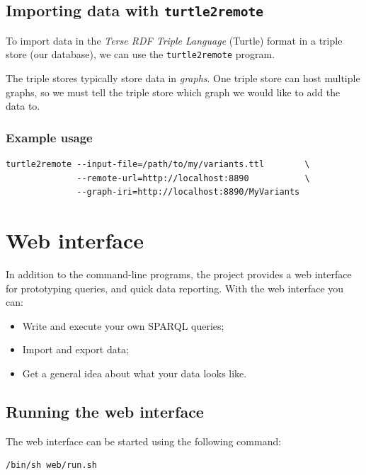 \documentclass[11pt,a4paper,oneside]{book}
\begin{document}
\section{Importing data with \texttt{turtle2remote}}
\label{sec:turtle2remote}

  To import data in the \emph{Terse RDF Triple Language} (Turtle) format in
  a triple store (our database), we can use the \texttt{turtle2remote} program.

  The triple stores typically store data in \emph{graphs}.  One triple store
  can host multiple graphs, so we must tell the triple store which graph we
  would like to add the data to.

\subsection{Example usage}

\begin{siderules}
\begin{verbatim}
turtle2remote --input-file=/path/to/my/variants.ttl        \
              --remote-url=http://localhost:8890           \
              --graph-iri=http://localhost:8890/MyVariants
\end{verbatim}
\end{siderules}

\chapter{Web interface}
\label{chap:web-interface}

  In addition to the command-line programs, the project provides a web
  interface for prototyping queries, and quick data reporting.  With the
  web interface you can:
  \begin{itemize}
  \item Write and execute your own SPARQL queries;
  \item Import and export data;
  \item Get a general idea about what your data looks like.
  \end{itemize}

\section{Running the web interface}

  The web interface can be started using the following command:

\begin{siderules}
\begin{verbatim}
/bin/sh web/run.sh
\end{verbatim}
\end{siderules}
\end{document}
